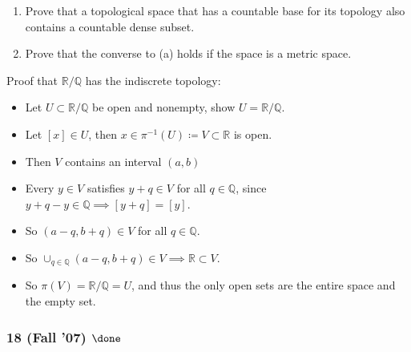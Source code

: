 \begin{problem}[?]

\begin{enumerate}
\def\labelenumi{\alph{enumi}.}
\item
  Prove that a topological space that has a countable base for its
  topology also contains a countable dense subset.
\item
  Prove that the converse to (a) holds if the space is a metric space.
\end{enumerate}

\end{problem}

\begin{solution}

\envlist

\begin{concept}

\envlist

\end{concept}

Proof that \({\mathbb{R}}/{\mathbb{Q}}\) has the indiscrete topology:

\begin{itemize}
\tightlist
\item
  Let \(U \subset {\mathbb{R}}/{\mathbb{Q}}\) be open and nonempty, show
  \(U = {\mathbb{R}}/{\mathbb{Q}}\).
\item
  Let \([x] \in U\), then
  \(x \in \pi^{-1}(U) \coloneqq V \subset{\mathbb{R}}\) is open.
\item
  Then \(V\) contains an interval \((a, b)\)
\item
  Every \(y\in V\) satisfies \(y+q \in V\) for all
  \(q\in {\mathbb{Q}}\), since
  \(y+q-y \in {\mathbb{Q}}\implies [y+q] = [y]\).
\item
  So \((a-q, b+q) \in V\) for all \(q\in {\mathbb{Q}}\).
\item
  So
  \(\cup_{q\in {\mathbb{Q}}}(a-q, b+q) \in V \implies {\mathbb{R}}\subset V\).
\item
  So \(\pi(V) = {\mathbb{R}}/{\mathbb{Q}}= U\), and thus the only open
  sets are the entire space and the empty set.
\end{itemize}

\end{solution}

\hypertarget{fall-07-done}{%
\subsubsection{\texorpdfstring{18 (Fall '07)
\(\done\)}{18 (Fall '07) \textbackslash done}}\label{fall-07-done}}

